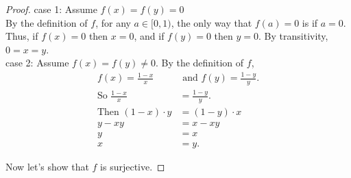\documentclass{amsart}
\begin{document}
\begin{enumerate}[1.]
\begin{proof}
case 1: Assume $f(x) = f(y) = 0$ \\
    By the definition of $f$, for any $a\in[0,1)$, the only way 
    that $f(a) = 0$ is if $a = 0$. Thus, if $f(x) = 0$ then $x = 0$,
    and if $f(y) = 0$ then $y = 0$. By transitivity, $0 = x = y$.\\

case 2: Assume $f(x) = f(y) \neq 0$. By the definition of $f$,
\begin{align*}
    f(x) = \frac{1-x}{x} &\text{ and } f(y) = \frac{1-y}{y}. \\
    \text{So } \frac{1-x}{x} &= \frac{1-y}{y}. \\
    \text{Then } (1 - x)\cdot y &= (1 - y)\cdot x \\
    y - xy &= x - xy \\
    y  &= x \\
    x &= y. 
\end{align*}

Now let's show that $f$ is surjective.

\end{proof}

\end{enumerate}
\end{document}
